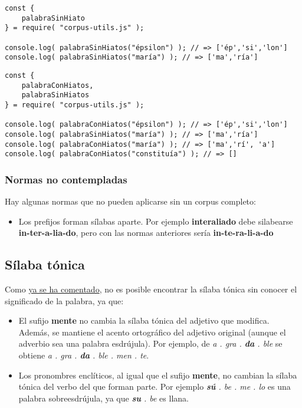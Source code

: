\documentclass[11pt]{article}
\begin{document}
\lstset{language=typescript,label= ,caption= ,captionpos=b,numbers=none}
\begin{lstlisting}
const {
    palabraSinHiato
} = require( "corpus-utils.js" );

console.log( palabraSinHiatos("épsilon") ); // => ['ép','si','lon']
console.log( palabraSinHiatos("maría") ); // => ['ma','ría']
\end{lstlisting}



\lstset{language=typescript,label= ,caption= ,captionpos=b,numbers=none}
\begin{lstlisting}
const {
    palabraConHiatos,
    palabraSinHiatos
} = require( "corpus-utils.js" );

console.log( palabraConHiatos("épsilon") ); // => ['ép','si','lon']
console.log( palabraSinHiatos("maría") ); // => ['ma','ría']
console.log( palabraConHiatos("maría") ); // => ['ma','rí', 'a']
console.log( palabraConHiatos("constituía") ); // => []
\end{lstlisting}


\subsubsection{Normas no contempladas}
\label{sec:org000001e}
Hay algunas normas que no pueden aplicarse sin un corpus completo:
\begin{itemize}
\item Los prefijos forman sílabas aparte. Por ejemplo \textbf{interaliado} debe silabearse \textbf{in-ter-a-lia-do}, pero con las normas anteriores sería \textbf{in-te-ra-li-a-do}
\end{itemize}


\subsection{Sílaba tónica}
\label{sec:org0000024}
Como \hyperref[silaba-tonica]{ya se ha comentado}, no es posible encontrar la sílaba tónica sin conocer el significado de la palabra, ya que:
\begin{itemize}
\item El sufijo \textbf{mente} no cambia la sílaba tónica del adjetivo que modifica. Además, se mantiene el acento ortográfico del adjetivo original (aunque el adverbio sea una palabra esdrújula). Por ejemplo, de \emph{a . gra . \textbf{da} . ble} se obtiene \emph{a . gra . \textbf{da} . ble . men . te}.
\item Los pronombres enclíticos, al igual que el sufijo \textbf{mente}, no cambian la sílaba tónica del verbo del que forman parte. Por ejemplo \emph{\textbf{sú} . be . me . lo} es una palabra sobreesdrújula, ya que \emph{\textbf{su} . be} es llana.
\end{itemize}
\end{document}
